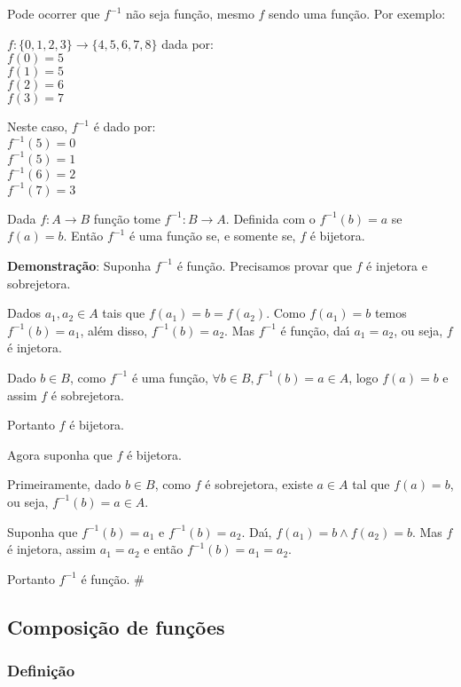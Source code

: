 Pode ocorrer que $f^{-1}$ n{\~a}o seja fun{\c c}{\~a}o, mesmo $f$ sendo uma fun{\c c}{\~a}o. Por exemplo:

$f:\{0,1,2,3\}\rightarrow\{4,5,6,7,8\}$ dada por:\\
$f(0)=5$\\
$f(1)=5$\\
$f(2)=6$\\
$f(3)=7$

Neste caso, $f^{-1}$ {\'e} dado por:\\
$f^{-1}(5)=0$\\
$f^{-1}(5)=1$\\
$f^{-1}(6)=2$\\
$f^{-1}(7)=3$

\begin{teorema}
Dada $f:A\rightarrow B$ fun{\c c}{\~a}o tome $f^{-1}:B\rightarrow A$. Definida com o $f^{-1}(b)=a$ se $f(a)=b$. Ent{\~a}o $f^{-1}$ {\'e} uma fun{\c c}{\~a}o se, e somente se, $f$ {\'e} bijetora.
\end{teorema}

\textbf{Demonstra{\c c}{\~a}o}: Suponha $f^{-1}$ {\'e} fun{\c c}{\~a}o. Precisamos provar que $f$ {\'e} injetora e sobrejetora.

Dados $a_{1},a_{2}\in A$ tais que $f(a_{1})=b=f(a_{2})$. Como $f(a_{1})=b$ temos $f^{-1}(b)=a_{1}$, al{\'e}m disso, $f^{-1}(b)=a_{2}$. Mas $f^{-1}$ {\'e} fun{\c c}{\~a}o, da{\'\i} $a_{1}=a_{2}$, ou seja, $f$ {\'e} injetora.

Dado $b\in B$, como $f^{-1}$ {\'e} uma fun{\c c}{\~a}o, $\forall b\in B, f^{-1}(b)=a\in A$, logo $f(a)=b$ e assim $f$ {\'e} sobrejetora.

Portanto $f$ {\'e} bijetora.

Agora suponha que $f$ {\'e} bijetora.

Primeiramente, dado $b\in B$, como $f$ {\'e} sobrejetora, existe $a\in A$ tal que $f(a)=b$, ou seja, $f^{-1}(b)=a\in A$.

Suponha que $f^{-1}(b)=a_{1}$ e $f^{-1}(b)=a_{2}$. Da{\'\i}, $f(a_{1})=b\wedge f(a_{2})=b$. Mas $f$ {\'e} injetora, assim $a_{1}=a_{2}$ e ent{\~a}o $f^{-1}(b)=a_{1}=a_{2}$.

Portanto $f^{-1}$ {\'e} fun{\c c}{\~a}o. \#
\subsection{Composi{\c c}{\~a}o de fun{\c c}{\~o}es}

\subsubsection{Defini{\c c}{\~a}o}

